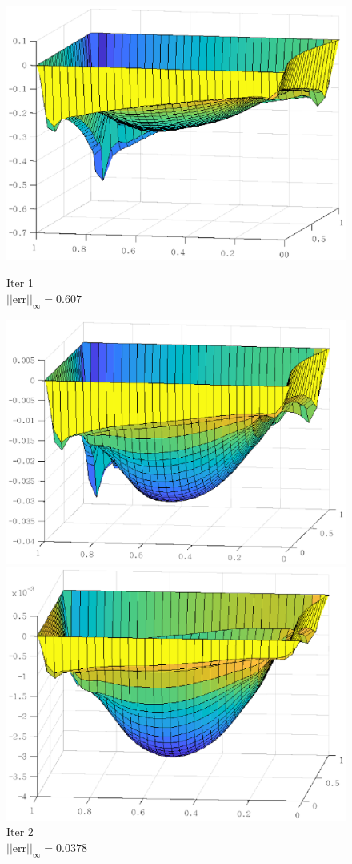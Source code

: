 \documentclass[lang=cn,10pt]{elegantbook}
\begin{document}
\begin{figure}[H]
  \centering
  \begin{minipage}[t]{0.24\linewidth}
      \centering
      \includegraphics[width=0.9\linewidth]{figure/3-4-1.eps}
      \caption*{\small Iter 1 \\ $||\text{err}||_\infty=0.607$}
  \end{minipage}
  \begin{minipage}[t]{0.24\linewidth}
    \centering
    \includegraphics[width=0.9\linewidth]{figure/3-4-2.eps}
    \caption*{\small Iter 2 \\ $||\text{err}||_\infty=0.0378$}
  \end{minipage}
  \begin{minipage}[t]{0.24\linewidth}
    \centering
    \includegraphics[width=0.9\linewidth]{figure/3-4-3.eps}

\end{minipage}
\end{figure}
\end{document}
